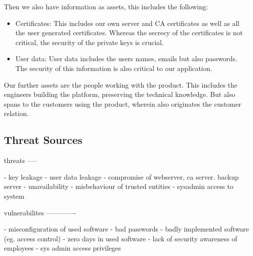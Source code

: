 \documentclass[english]{article}
\begin{document}
Then we also have information as assets, this includes the following:

\begin{itemize}
	\item Certificates: This includes our own server and CA certificates as well as all the user generated certificates. Whereas the secrecy of the certificates is not critical, the security of the private keys is crucial. 
	\item User data: User data includes the users names, emails but also passwords. The security of this information is also critical to our application.
\end{itemize}

Our further assets are the people working with the product. This includes the engineers building the platform, preserving the technical knowledge. But also spans to the customers using the product, wherein also originates the customer relation.   

\subsection{Threat Sources}

threats
-----

- key leakage
- user data leakage
- compromise of webserver, ca server. backup server
- unavailability
- misbehaviour of trusted entities
- sysadmin access to system

vulnerabilites
-------------

- misconfiguration of used software
- bad passwords
- badly implemented software (eg. access control)
- zero days in used software
- lack of security awareness of employees
- sys admin access privileges




\end{document}
